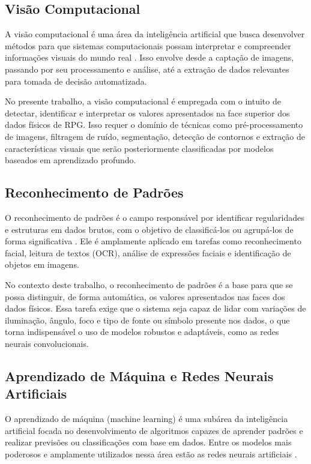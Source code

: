 \subsection{Visão Computacional}

A visão computacional é uma área da inteligência artificial que
busca desenvolver métodos para que sistemas computacionais possam
interpretar e compreender informações visuais do mundo real
\cite{szeliski2010computer}. Isso envolve desde a captação de imagens,
passando por seu processamento e análise, até a extração de dados
relevantes para tomada de decisão automatizada.

No presente trabalho, a visão computacional é empregada com o
intuito de detectar, identificar e interpretar os valores apresentados
na face superior dos dados físicos de RPG. Isso requer o domínio
de técnicas como pré-processamento de imagens, filtragem de ruído,
segmentação, detecção de contornos e extração de características
visuais que serão posteriormente classificadas por modelos baseados
em aprendizado profundo.

\subsection{Reconhecimento de Padrões}

O reconhecimento de padrões é o campo responsável por identificar
regularidades e estruturas em dados brutos, com o objetivo de
classificá-los ou agrupá-los de forma significativa
\cite{bishop2006pattern}. Ele é amplamente aplicado em tarefas como
reconhecimento facial, leitura de textos (OCR), análise de expressões
faciais e identificação de objetos em imagens.

No contexto deste trabalho, o reconhecimento de padrões é a base
para que se possa distinguir, de forma automática, os valores
apresentados nas faces dos dados físicos. Essa tarefa exige que
o sistema seja capaz de lidar com variações de iluminação, ângulo,
foco e tipo de fonte ou símbolo presente nos dados, o que torna
indispensável o uso de modelos robustos e adaptáveis, como as
redes neurais convolucionais.

\subsection{Aprendizado de Máquina e Redes Neurais Artificiais}

O aprendizado de máquina (machine learning) é uma subárea da
inteligência artificial focada no desenvolvimento de algoritmos
capazes de aprender padrões e realizar previsões ou classificações
com base em dados. Entre os modelos mais poderosos e amplamente
utilizados nessa área estão as redes neurais artificiais
\cite{goodfellow2016deep}.

